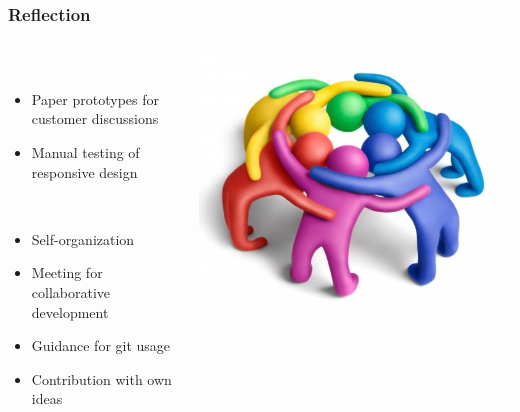 \begin{frame}
  \frametitle{Reflection}
  \begin{columns}
  	\begin{column}{0.8\textwidth}
  \begin{description}[]
    \item[General] \hfill \\
        \begin{itemize}
          \item Paper prototypes for customer discussions
          \item Manual testing of responsive design
        \end{itemize}
    \item[Bachelor students team] \hfill \\
      \begin{itemize}
        \item Self-organization
        \item Meeting for collaborative development
        \item Guidance for git usage
        \item Contribution with own ideas
      \end{itemize}
  \end{description} 
    \end{column}
    \begin{column}{0.2\textwidth}
   	  \includegraphics[width=\textwidth]{images/team}
    \end{column}
  \end{columns}
\end{frame}

